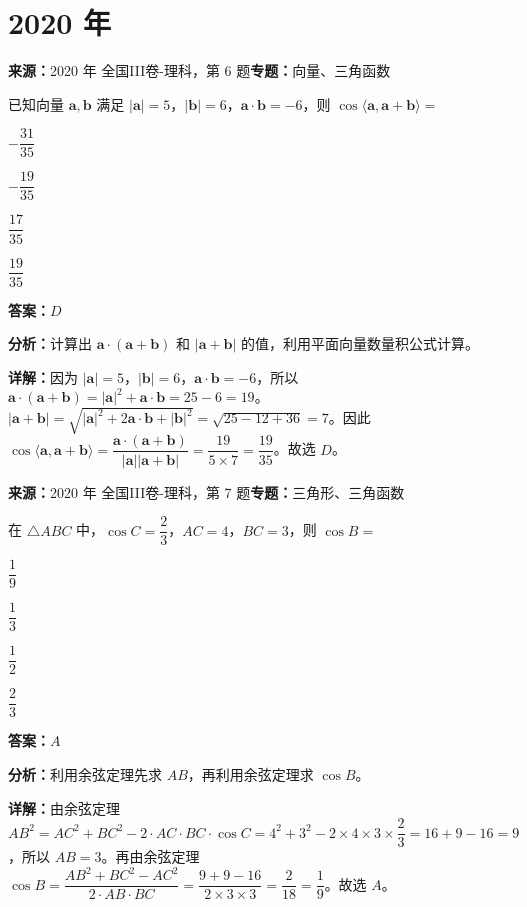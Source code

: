 \section*{2020 年}

\begin{question}[points=5]
\textbf{来源：}2020 年 全国III卷-理科，第 6 题\quad \textbf{专题：}向量、三角函数\par
已知向量 $\mathbf{a},\mathbf{b}$ 满足 $|\mathbf{a}|=5$，$|\mathbf{b}|=6$，$\mathbf{a}\cdot\mathbf{b}=-6$，则 $\cos\langle\mathbf{a},\mathbf{a}+\mathbf{b}\rangle=$
\begin{choices}
  \item $-\dfrac{31}{35}$
  \item $-\dfrac{19}{35}$
  \item $\dfrac{17}{35}$
  \item $\dfrac{19}{35}$
\end{choices}
\begin{solution}
\textbf{答案：}$D$

\textbf{分析：}计算出 $\mathbf{a}\cdot(\mathbf{a}+\mathbf{b})$ 和 $|\mathbf{a}+\mathbf{b}|$ 的值，利用平面向量数量积公式计算。

\textbf{详解：}因为 $|\mathbf{a}|=5$，$|\mathbf{b}|=6$，$\mathbf{a}\cdot\mathbf{b}=-6$，所以 $\mathbf{a}\cdot(\mathbf{a}+\mathbf{b})=|\mathbf{a}|^2+\mathbf{a}\cdot\mathbf{b}=25-6=19$。$|\mathbf{a}+\mathbf{b}|=\sqrt{|\mathbf{a}|^2+2\mathbf{a}\cdot\mathbf{b}+|\mathbf{b}|^2}=\sqrt{25-12+36}=7$。因此 $\cos\langle\mathbf{a},\mathbf{a}+\mathbf{b}\rangle=\dfrac{\mathbf{a}\cdot(\mathbf{a}+\mathbf{b})}{|\mathbf{a}||\mathbf{a}+\mathbf{b}|}=\dfrac{19}{5\times7}=\dfrac{19}{35}$。故选 $D$。
\end{solution}
\end{question}

\begin{question}[points=5]
\textbf{来源：}2020 年 全国III卷-理科，第 7 题\quad \textbf{专题：}三角形、三角函数\par
在 $\triangle ABC$ 中，$\cos C=\dfrac{2}{3}$，$AC=4$，$BC=3$，则 $\cos B=$
\begin{choices}
  \item $\dfrac{1}{9}$
  \item $\dfrac{1}{3}$
  \item $\dfrac{1}{2}$
  \item $\dfrac{2}{3}$
\end{choices}
\begin{solution}
\textbf{答案：}$A$

\textbf{分析：}利用余弦定理先求 $AB$，再利用余弦定理求 $\cos B$。

\textbf{详解：}由余弦定理 $AB^2=AC^2+BC^2-2\cdot AC\cdot BC\cdot\cos C=4^2+3^2-2\times4\times3\times\dfrac{2}{3}=16+9-16=9$，所以 $AB=3$。再由余弦定理 $\cos B=\dfrac{AB^2+BC^2-AC^2}{2\cdot AB\cdot BC}=\dfrac{9+9-16}{2\times3\times3}=\dfrac{2}{18}=\dfrac{1}{9}$。故选 $A$。
\end{solution}
\end{question}

